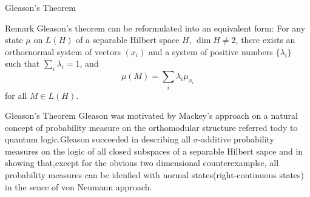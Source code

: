 \documentclass{beamer}
\begin{document}
\begin{frame}{Gleason's Theorem}
\begin{block}{Remark}
    Gleason's theorem can be reformulated into an equivalent form: For any state \(\mu\) on \(L(H)\) of a separable Hilbert space \(H\), \(\dim H \neq 2\), there exists an orthornormal system of vectors \((x_i)\) and a system of positive numbers \(\{\lambda_i\}\) such that \(\sum_i \lambda_i=1\), and \[\mu(M) = \sum_i \lambda_i \mu_{x_i}\]
    for all \(M \in L(H)\).
\end{block}
\end{frame}
\begin{frame}{Gleason's Theorem}
    Gleason was motivated by Mackey's approach on a natural concept of probability measure on the orthomodular structure referred tody to quantum logic.\pause Gleason succeeded in describing all \(\sigma\)-additive probability measures on the logic of all closed subspaces of a separable Hilbert sapce and in showing that,\pause except for the obvious two dimensional counterexamplse, all probability measures can be idenfied with normal states(right-continuous states) in the sence of von Neumann approach.
\end{frame}
    
\end{document}
